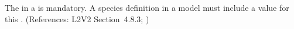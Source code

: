The   in a \Species is mandatory.  A species
definition in a model must include a value for this .  (References:
L2V2 Section~4.8.3; )
